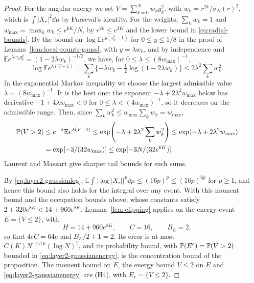 \begin{proof}
For the angular energy we set $V=\sum_{k=0}^Nw_kg_k^2$, with
$w_k=r^{2k}/\sigma_N(r)^2$, which is $\int|X_r|^2\dd\mu$ by Parseval's
identity.
For the weights, $\sum_kw_k=1$ and $w_{\max}=\max_kw_k\le e^{6K}/N$, by
$r^{2k}\le e^{2K}$ and the lower bound in \eqref{eq:radial-bounds}.
By the bound on $\log\mathbb Ee^{y(g_k^2-1)}$ for $0\le y\le1/8$ in the
proof of Lemma~\ref{lem:local-counts-gauss}, with $y=\lambda w_k$, and by
independence and $\mathbb Ee^{\lambda w_kg_k^2}=(1-2\lambda w_k)^{-1/2}$,
we have, for $0\le\lambda\le(8w_{\max})^{-1}$,
\[
 \log\mathbb Ee^{\lambda(V-1)}
 =\sum_k\{-\lambda w_k-\tfrac12\log(1-2\lambda w_k)\}
 \le2\lambda^2\sum_kw_k^2.
\]
In the exponential Markov inequality we choose the largest admissible
value $\lambda=(8w_{\max})^{-1}$. It is the best one: the exponent
$-\lambda+2\lambda^2w_{\max}$ below has derivative $-1+4\lambda w_{\max}<0$
for $0\le\lambda<(4w_{\max})^{-1}$, so it decreases on the admissible range.
Then, since $\sum_kw_k^2\le w_{\max}\sum_kw_k=w_{\max}$,
\begin{equation}
 \begin{aligned}
 \mathbb P(V>2)
 &\le e^{-\lambda}\mathbb Ee^{\lambda(V-1)}
 \le\exp\!\left(-\lambda+2\lambda^2\sum_kw_k^2\right)
 \le\exp(-\lambda+2\lambda^2w_{\max})\\
 &=\exp[-3/(32w_{\max})]
 \le\exp[-3N/(32e^{6K})].
 \end{aligned}                                      \label{eq:layer2-gaussianenergy}
\end{equation}
Laurent and Massart \cite{LaurentMassart2000} give sharper tail bounds
for such sums.

By \eqref{eq:layer2-gaussianlog},
$\mathbb E\int|\log|X_r||^p\dd\mu\le(16p)^p\le(16p)^{6p}$ for $p\ge1$,
and hence this bound also holds for the integral over any event.
With this moment bound and the occupation bounds above, whose constants
satisfy
$2+320e^{8K}<14+960e^{8K}$, Lemma~\ref{lem:clipping} applies on the
energy event $E=\{V\le2\}$, with
\[
 H=14+960e^{8K},\qquad C=16,\qquad B_E=2,
\]
so that $4eC=64e$ and $B_E/2+1=2$.
Its error is at most $C(K)N^{-1/16}(\log N)^7$, and its probability
bound, with $\mathbb P(E^c)=\mathbb P(V>2)$ bounded in
\eqref{eq:layer2-gaussianenergy}, is the concentration bound of the
proposition.
The moment bound on $E$, the energy bound $V\le2$ on $E$ and
\eqref{eq:layer2-gaussianenergy} are (H4), with $E_r=\{V\le2\}$.


\end{proof}
